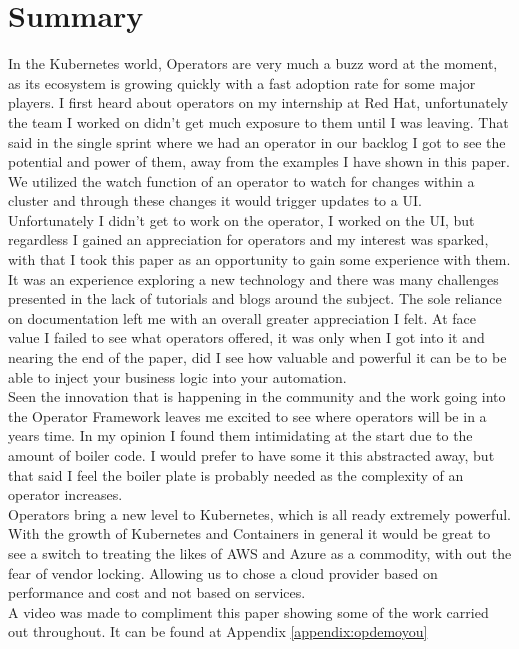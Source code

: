 \section{Summary}
In the Kubernetes world, Operators are very much a buzz word at the moment, as its ecosystem is growing quickly with a fast adoption rate for some major players. I first heard about operators on my internship at Red Hat, unfortunately the team I worked on didn't get much exposure to them until I was leaving. That said in the single sprint where we had an operator in our backlog I got to see the potential and power of them, away from the examples I have shown in this paper. We utilized the watch function of an operator to watch for changes within a cluster and through these changes it would trigger updates to a UI. Unfortunately I didn't get to work on the operator, I worked on the UI, but regardless I gained an appreciation for operators and my interest was sparked, with that I took this paper as an opportunity to gain some experience with them.
\\It was an experience exploring a new technology and there was many challenges presented in the lack of tutorials and blogs around the subject. The sole reliance on documentation left me with an overall greater appreciation I felt. At face value I failed to see what operators offered, it was only when I got into it and nearing the end of the paper, did I see how valuable and powerful it can be to be able to inject your business logic into your automation. 
\\Seen the innovation that is happening in the community and the work going into the Operator Framework leaves me excited to see where operators will be in a years time. In my opinion I found them intimidating at the start due to the amount of boiler code. I would prefer to have some it this abstracted away, but that said I feel the boiler plate is probably needed as the complexity of an operator increases.
\\Operators bring a new level to Kubernetes, which is all ready extremely powerful. With the growth of Kubernetes and Containers in general it would be great to see a switch to treating the likes of AWS and Azure as a commodity, with out the fear of vendor locking. Allowing us to chose a cloud provider based on performance and cost and not based on services.
\\A video was made to compliment this paper showing some of the work carried out throughout. It can be found at Appendix \ref{appendix:opdemoyou}

